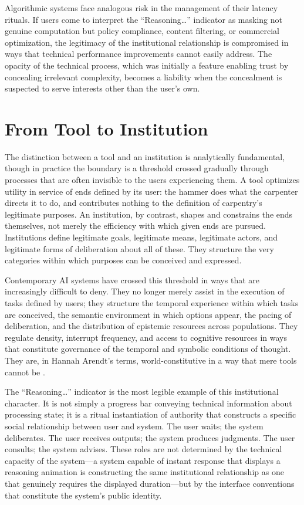 \documentclass[12pt]{article}
\begin{document}
Algorithmic systems face analogous risk in the management of their latency rituals. If users come to interpret the ``Reasoning\ldots'' indicator as masking not genuine computation but policy compliance, content filtering, or commercial optimization, the legitimacy of the institutional relationship is compromised in ways that technical performance improvements cannot easily address. The opacity of the technical process, which was initially a feature enabling trust by concealing irrelevant complexity, becomes a liability when the concealment is suspected to serve interests other than the user's own.

\section{From Tool to Institution}

The distinction between a tool and an institution is analytically fundamental, though in practice the boundary is a threshold crossed gradually through processes that are often invisible to the users experiencing them. A tool optimizes utility in service of ends defined by its user: the hammer does what the carpenter directs it to do, and contributes nothing to the definition of carpentry's legitimate purposes. An institution, by contrast, shapes and constrains the ends themselves, not merely the efficiency with which given ends are pursued. Institutions define legitimate goals, legitimate means, legitimate actors, and legitimate forms of deliberation about all of these. They structure the very categories within which purposes can be conceived and expressed.

Contemporary AI systems have crossed this threshold in ways that are increasingly difficult to deny. They no longer merely assist in the execution of tasks defined by users; they structure the temporal experience within which tasks are conceived, the semantic environment in which options appear, the pacing of deliberation, and the distribution of epistemic resources across populations. They regulate density, interrupt frequency, and access to cognitive resources in ways that constitute governance of the temporal and symbolic conditions of thought. They are, in Hannah Arendt's terms, world-constitutive in a way that mere tools cannot be \citep{Arendt1958}.

The ``Reasoning\ldots'' indicator is the most legible example of this institutional character. It is not simply a progress bar conveying technical information about processing state; it is a ritual instantiation of authority that constructs a specific social relationship between user and system. The user waits; the system deliberates. The user receives outputs; the system produces judgments. The user consults; the system advises. These roles are not determined by the technical capacity of the system---a system capable of instant response that displays a reasoning animation is constructing the same institutional relationship as one that genuinely requires the displayed duration---but by the interface conventions that constitute the system's public identity.
\end{document}
